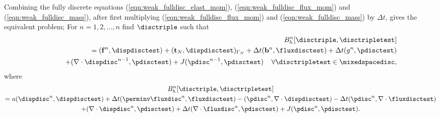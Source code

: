 Combining the fully discrete equations (\ref{eqn:weak_fulldisc_elast_mom}), (\ref{eqn:weak_fulldisc_flux_mom}) and (\ref{eqn:weak_fulldisc_mass}), after first multiplying (\ref{eqn:weak_fulldisc_flux_mom}) and (\ref{eqn:weak_fulldisc_mass}) by $\Delta t$, gives the equivalent problem; For $n = 1,2,\ldots, n$ find $\disctriple$ such that
\begin{eqnarray*}
\label{Btimestep_weakform}
&&B_{h}^{n}[\disctriple,\disctripletest] \nonumber \\
&& \quad = (\mathbf{f}^{n},\dispdisctest) + (\mathbf{t}_{N},\dispdisctest)_{\Gamma_{N}}
          + \Delta t(\mathbf{b}^{n},\fluxdisctest)
          +\Delta t(g^{n},\pdisctest) \nonumber \\
&& \qquad + (\nabla \cdot \dispdisc^{n-1} ,\pdisctest)
          + J(\pdisc^{n-1},\pdisctest)\;\;\;\; \forall \disctripletest \in \mixedspacedisc,
\end{eqnarray*}
where
\begin{multline}
B_{h}^{n}[\disctriple,\disctripletest] \\
=a(\dispdisc^{n},\dispdisctest)+ \Delta t(\perminv \fluxdisc^{n}, \fluxdisctest) - (\pdisc^{n}, \nabla \cdot \dispdisctest)  - \Delta t (\pdisc^{n}, \nabla \cdot \fluxdisctest) \\ + (\nabla \cdot \dispdisc^{n},\pdisctest)  + \Delta t ( \nabla \cdot \fluxdisc^{n},\pdisctest) + J(\pdisc^{n},\pdisctest).
\label{combined_weak_form_fem}
\end{multline}

